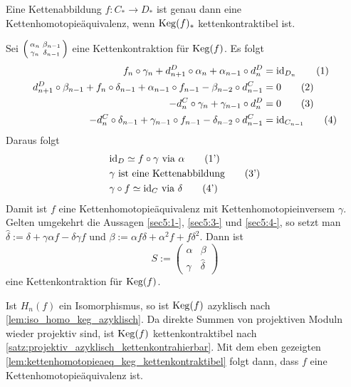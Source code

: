 \begin{lemma}[{name=[{Kettenhomotopieäquivalenz genau dann, wenn der Kegel kettenkontraktibel ist}]},label=lem:kettenhomotopieaeq_keg_kettenkontraktibel]
	Eine Kettenabbildung $f\colon C_* \to D_*$ ist genau dann eine Kettenhomotopieäquivalenz, wenn $\operatorname{Keg}(f)_*$ kettenkontraktibel ist.
\end{lemma}
\begin{beweis}
	Sei $\begin{psmallmatrix} \alpha_n & \beta_{n-1} \\ \gamma_n & \delta_{n-1} \end{psmallmatrix}$ eine Kettenkontraktion für $\operatorname{Keg}(f)$. Es folgt 
	\begin{align}
		f_n \circ \gamma_n + d^D_{n+1} \circ \alpha_n + \alpha_{n-1} \circ d_n^D &= {\operatorname{id}_{D_n}} \tag*{(1)} \\
		d^D_{n+1} \circ \beta_{n-1} + f_n \circ \delta_{n-1} + \alpha_{n-1} \circ f_{n-1} - \beta_{n-2} \circ d_{n-1}^C &= 0 \tag*{(2)}\\
		- d^C_n \circ \gamma_n + \gamma_{n-1} \circ d_n^D &= 0 \tag*{(3)} \\
		- d_n^C \circ \delta_{n-1} + \gamma_{n-1} \circ f_{n-1} - \delta_{n-2} \circ d^C_{n-1} &= {\operatorname{id}_{C_{n-1}}} \tag*{(4)}
	\end{align}
	Daraus folgt
	\begin{align}
		& {\operatorname{id}_D} \simeq f \circ \gamma \text{ via } \alpha \tag*{(1')} \label{sec5:1-} \\
		& \gamma \text{ ist eine Kettenabbildung} \tag*{(3')} \label{sec5:3-}\\
		& \gamma \circ f \simeq {\operatorname{id}_C} \text{ via }  \delta \tag*{(4')} \label{sec5:4-}
	\end{align}
	Damit ist $f$ eine Kettenhomotopieäquivalenz mit Kettenhomotopieinversem $\gamma$. 
	Gelten umgekehrt die Aussagen \ref{sec5:1-}, \ref{sec5:3-} und \ref{sec5:4-}, so setzt man $\hat{\delta} := \delta + \gamma \alpha f - \delta \gamma f$ und 
	$\beta := \alpha f \delta + \alpha^2 f + f \delta^2$. Dann ist
	\[
		S := \begin{pmatrix}
			\alpha & \beta \\
			\gamma & \hat{\delta}
		\end{pmatrix}
	\]
	eine Kettenkontraktion für $\operatorname{Keg}(f)$.
\end{beweis}

\begin{beweis}[name={von \autoref{satz:5:kettenhomotopie} zweite Implikation},label=bew:satz5]
	Ist $H_n(f)$ ein Isomorphismus, so ist $\operatorname{Keg}(f)$ azyklisch nach \autoref{lem:iso_homo_keg_azyklisch}. 
	Da direkte Summen von projektiven Moduln wieder projektiv sind, ist $\operatorname{Keg}(f)$ kettenkontraktibel nach \autoref{satz:projektiv_azyklisch_kettenkontrahierbar}.
	Mit dem eben gezeigten \autoref{lem:kettenhomotopieaeq_keg_kettenkontraktibel} folgt dann, dass $f$ eine Kettenhomotopieäquivalenz ist.
\end{beweis}


